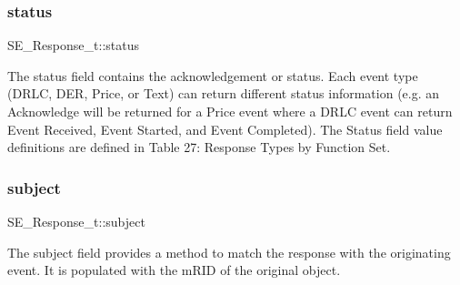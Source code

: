 \subsubsection{\texorpdfstring{status}{status}}
{\footnotesize\ttfamily S\+E\+\_\+\+Response\+\_\+t\+::status}

The status field contains the acknowledgement or status. Each event type (D\+R\+LC, D\+ER, Price, or Text) can return different status information (e.\+g. an Acknowledge will be returned for a Price event where a D\+R\+LC event can return Event Received, Event Started, and Event Completed). The Status field value definitions are defined in Table 27\+: Response Types by Function Set. \mbox{\label{group__Response_gac727cbc06cbfcea07b72fd18c0d1bf24}} 
\subsubsection{\texorpdfstring{subject}{subject}}
{\footnotesize\ttfamily S\+E\+\_\+\+Response\+\_\+t\+::subject}

The subject field provides a method to match the response with the originating event. It is populated with the m\+R\+ID of the original object. 